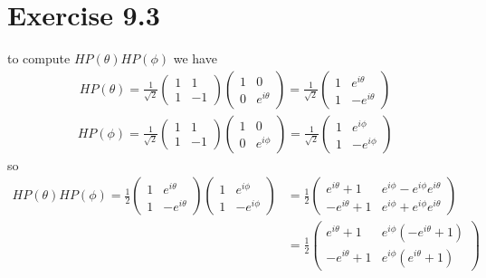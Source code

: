 \documentclass{article}
\begin{document}
\section*{Exercise 9.3}
to compute $HP(\theta)HP(\phi)$ we have
\begin{align*}
    HP(\theta) = \frac{1}{\sqrt{2}}\begin{pmatrix}
        1 & 1 \\ 1 & -1
    \end{pmatrix}
    \begin{pmatrix}
        1 & 0 \\ 0 & e^{i\theta}
    \end{pmatrix} =
    \frac{1}{\sqrt{2}}
    \begin{pmatrix}
        1 & e^{i\theta} \\
        1 & -e^{i\theta}
    \end{pmatrix}
\end{align*}
\begin{align*}
    HP(\phi) = \frac{1}{\sqrt{2}}\begin{pmatrix}
        1 & 1 \\ 1 & -1
    \end{pmatrix}
    \begin{pmatrix}
        1 & 0 \\ 0 & e^{i\phi}
    \end{pmatrix} =
    \frac{1}{\sqrt{2}}
    \begin{pmatrix}
        1 & e^{i\phi} \\
        1 & -e^{i\phi}
    \end{pmatrix}
\end{align*}
so
\begin{align}
    HP(\theta)HP(\phi) =  \frac{1}{2}
    \begin{pmatrix}
        1 & e^{i\theta} \\
        1 & -e^{i\theta}
    \end{pmatrix}
    \begin{pmatrix}
        1 & e^{i\phi} \\
        1 & -e^{i\phi}
    \end{pmatrix} \nonumber
    &= \frac{1}{2}
    \begin{pmatrix}
        e^{i\theta}+1 & e^{i\phi} - e^{i\phi}e^{i\theta} \\
        -e^{i\theta}+1 & e^{i\phi} + e^{i\phi}e^{i\theta}
    \end{pmatrix} \\ 
    &= \frac{1}{2} 
    \begin{pmatrix}
        e^{i\theta}+1 & e^{i\phi} (-e^{i\theta}+1) \\
        -e^{i\theta}+1 & e^{i\phi} (e^{i\theta}+1)
    \end{pmatrix} \label{eq1}
\end{align}
\end{document}
